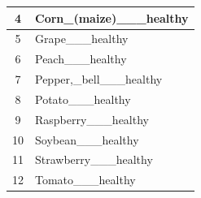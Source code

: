 \begin{table}[H]
\begin{minipage}[t]{0.53\textwidth}
\begin{tabular}{|c|p{4.5cm}|}
4 & Corn\_(maize)\_\_\_\allowbreak healthy \\ \hline
5 & Grape\_\_\_\allowbreak healthy \\ \hline
6 & Peach\_\_\_\allowbreak healthy \\ \hline
7 & Pepper,\_bell\_\_\_\allowbreak healthy \\ \hline
8 & Potato\_\_\_\allowbreak healthy \\ \hline
9 & Raspberry\_\_\_\allowbreak healthy \\ \hline
10 & Soybean\_\_\_\allowbreak healthy \\ \hline
11 & Strawberry\_\_\_\allowbreak healthy \\ \hline
12 & Tomato\_\_\_\allowbreak healthy \\ \hline
\end{tabular}
\end{minipage}
\end{table}

